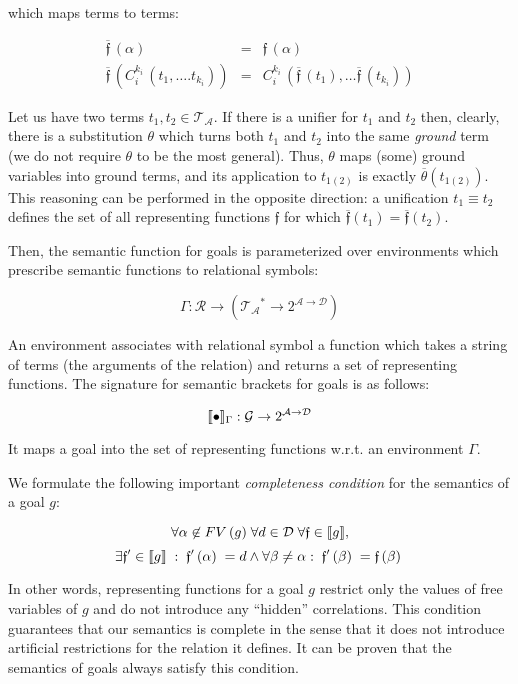 which maps terms to terms:

\[
\begin{array}{rcl}

  \overline{\mathfrak f}\,(\alpha) & = & \mathfrak f\,(\alpha)\\
  \overline{\mathfrak f}\,(C_i^{k_i}\,(t_1,\dots.t_{k_i})) & = & C_i^{k_i}\,(\overline{\mathfrak f}\,(t_1),\dots \overline{\mathfrak f}\,(t_{k_i}))
\end{array}
\]

Let us have two terms $t_1, t_2\in\mathcal{T_A}$. If there is a unifier for $t_1$ and $t_2$ then, clearly, there is a substitution $\theta$ which
turns both $t_1$ and $t_2$ into the same \emph{ground} term (we do not require $\theta$ to be the most general). Thus, $\theta$ maps
(some) ground variables into ground terms, and its application to $t_{1(2)}$ is exactly $\overline{\theta}(t_{1(2)})$. This reasoning can be
performed in the opposite direction: a unification $t_1\equiv t_2$ defines the set of all representing functions $\mathfrak{f}$ for which
$\overline{\mathfrak{f}}(t_1)=\overline{\mathfrak{f}}(t_2)$. 

Then, the semantic function for goals is parameterized over environments which prescribe semantic functions to relational symbols:

\[
  \Gamma : \mathcal{R} \to (\mathcal{T_A}^*\to 2^{\mathcal{A}\to\mathcal{D}})
\]

An environment associates with relational symbol a function which takes a string of terms (the arguments of the relation) and returns a set of
representing functions. The signature for semantic brackets for goals is as follows:

\[
\llbracket{\bullet}\rrbracket_{\Gamma} : \mathcal{G}\to 2^{\mathcal{A}\to\mathcal{D}}
\]

It maps a goal into the set of representing functions w.r.t. an environment $\Gamma$.

We formulate the following important \emph{completeness condition} for the semantics of a goal $g$:

\[
\forall\alpha\not\in FV\,(g)\; \forall d \in \mathcal{D}\; \forall\mathfrak{f} \in \llbracket{g}\rrbracket,
\]
\[
\exists \mathfrak{f'} \in \llbracket{g}\rrbracket \;:\; \mathfrak{f'}\,(\alpha)\; = d \wedge \forall \beta \neq \alpha:\; \mathfrak{f'}\,(\beta)\; = \mathfrak{f}\,(\beta)\; 
\]

In other words, representing functions for a goal $g$ restrict only the values of free variables of $g$ and do not introduce any ``hidden'' correlations.
This condition guarantees that our semantics is complete in the sense that it does not introduce artificial restrictions for the relation it defines. It
can be proven that the semantics of goals always satisfy this condition.

